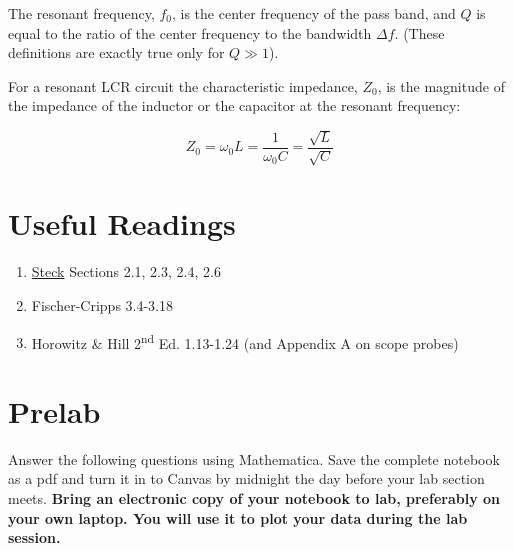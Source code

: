 \documentclass[10pt]{PhysLab1C} %
\begin{document}
The resonant frequency, \(f_{0}\), is the center frequency of the pass
band, and \(Q\) is equal to the ratio of the center frequency to the
bandwidth \(\Delta f\). (These definitions are exactly true only for
\(Q\gg1\)).

For a resonant LCR circuit the characteristic impedance, \(Z_0\), is the
magnitude of the impedance of the inductor or the capacitor at the
resonant frequency:

\[Z_{0} = \omega_{0}L = \frac{1}{\omega_{0}C} = \frac{\sqrt{L}}{\sqrt{C}}\]


\section{Useful Readings}

\begin{enumerate}
\item
  \href{https://atomoptics-nas.uoregon.edu/~dsteck/teaching/electronics/electronics-notes.pdf}{Steck} Sections 2.1, 2.3, 2.4, 2.6
\item
  Fischer-Cripps 3.4-3.18
\item
  Horowitz \& Hill 2\textsuperscript{nd} Ed. 1.13-1.24 (and Appendix A
  on scope probes)
\end{enumerate}


\section{Prelab}

Answer the following questions using Mathematica. Save the complete
notebook as a pdf and turn it in to Canvas by midnight the day before
your lab section meets. \textbf{Bring an electronic copy of your
notebook to lab, preferably on your own laptop. You will use it to plot
your data during the lab session.}

\end{document}
